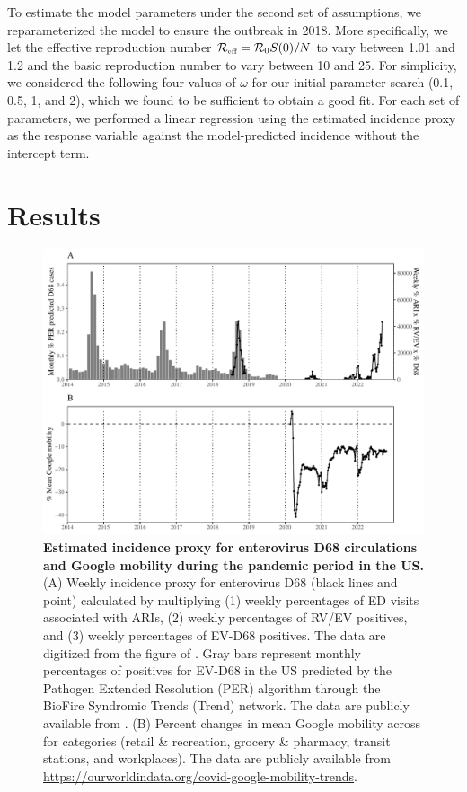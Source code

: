 \documentclass[12pt]{article}
\newcommand{\tsub}[2]{#1_{{\textrm{\tiny #2}}}}
\begin{document}
To estimate the model parameters under the second set of assumptions, we reparameterized the model to ensure the outbreak in 2018.
More specifically, we let the effective reproduction number $\tsub{\mathcal{R}}{eff} = \mathcal R_0 S(0)/N$ to vary between 1.01 and 1.2 and the basic reproduction number to vary between 10 and 25.
For simplicity, we considered the following four values of $\omega$ for our initial parameter search (0.1, 0.5, 1, and 2), which we found to be sufficient to obtain a good fit.
For each set of parameters, we performed a linear regression using the estimated incidence proxy as the response variable against the model-predicted incidence without the intercept term.

\section{Results}

\begin{figure}[!th]
\includegraphics[width=\textwidth]{../figure_pub/figure1.pdf}
\caption{
\textbf{Estimated incidence proxy for enterovirus D68 circulations and Google mobility during the pandemic period in the US.}
(A) Weekly incidence proxy for enterovirus D68 (black lines and point) calculated by multiplying (1) weekly percentages of ED visits associated with ARIs, (2) weekly percentages of RV/EV positives, and (3) weekly percentages of EV-D68 positives.
The data are digitized from the figure of \cite{ma2022increase}.
Gray bars represent monthly percentages of positives for EV-D68 in the US predicted by the Pathogen Extended Resolution (PER) algorithm through the BioFire Syndromic Trends (Trend) network.
The data are publicly available from \cite{park2021epidemiological}.
(B) Percent changes in mean Google mobility across for categories (retail \& recreation, grocery \& pharmacy, transit stations, and workplaces).
The data are publicly available from \url{https://ourworldindata.org/covid-google-mobility-trends}.
}
\label{fig:fig1}
\end{figure}
\end{document}
